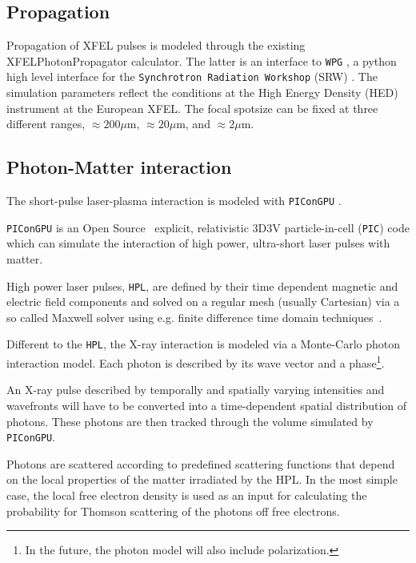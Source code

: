 \documentclass[a4paper]{article}
\begin{document}
\subsection{Propagation\label{sec:short_pulse_prop}}
Propagation of XFEL pulses is modeled through the existing XFELPhotonPropagator calculator. The latter is an interface
to \texttt{WPG} \cite{Samoylova2016, wpg_github}, a python high level interface for the \texttt{Synchrotron Radiation Workshop} (SRW) \cite{Chubar2008, srw_github}.
The simulation parameters reflect the conditions at the High Energy Density (HED) instrument \cite{Nakatsutsumi2014}
at the European XFEL. The focal spotsize can be fixed at three different ranges,
$\approx 200 \mu\text{m}$, $\approx 20 \mu\text{m}$, and $\approx 2 \mu\text{m}$.


%
\subsection{Photon-Matter interaction}
The short-pulse laser-plasma interaction is modeled with \texttt{PIConGPU} \cite{Bussmann2013}.

\texttt{PIConGPU} is an Open Source~\cite{picongpu_github} explicit, relativistic 3D3V particle-in-cell (\texttt{PIC}) code which can simulate the interaction of high power, ultra-short laser pulses with matter.

High power laser pulses, \texttt{HPL}, are defined by their time dependent magnetic and electric field components and solved on a regular mesh (usually Cartesian) via a so called Maxwell solver using e.g. finite difference time domain techniques~\cite{Yee1966}.

Different to the \texttt{HPL}, the X-ray interaction is modeled via a Monte-Carlo photon interaction model. Each photon is described by its wave vector and a phase\footnote{In the future, the photon model will also include polarization.}.

An X-ray pulse described by temporally and spatially varying intensities and wavefronts will have to be converted into a
time-dependent spatial distribution of photons. These photons are then tracked through the volume simulated by \texttt{PIConGPU}.

Photons are scattered according to predefined scattering functions that depend on the local properties of the matter irradiated by the HPL. In the most simple case, the local free electron density is used as an input for calculating the probability for Thomson scattering of the photons off free electrons.
\end{document}
